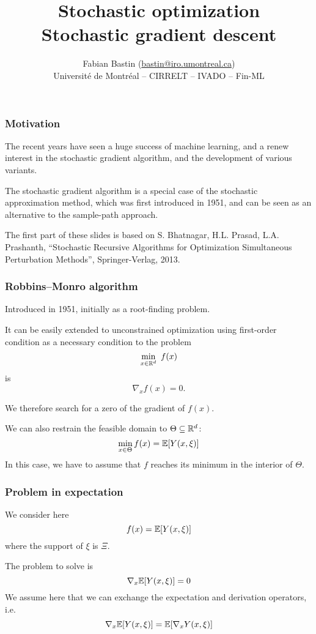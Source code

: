 \documentclass[usepdftitle=false, aspectratio=169]{beamer}
\title[SA vs SAA]{Stochastic optimization\\Stochastic gradient descent}
\author[Fabian Bastin]{Fabian Bastin (\url{bastin@iro.umontreal.ca}) \\ Université de Montréal -- CIRRELT -- IVADO -- Fin-ML}
\date{}
\begin{document}

\frame{\titlepage}

\begin{frame}
\frametitle{Motivation}

The recent years have seen a huge success of machine learning, and a renew interest in the stochastic gradient algorithm, and the development of various variants.

\mbox{}

The stochastic gradient algorithm is a special case of the stochastic approximation method, which was first introduced in 1951, and can be seen as an alternative to the sample-path approach.

\mbox{}

The first part of these slides is based on
S. Bhatnagar, H.L. Prasad, L.A. Prashanth, ``Stochastic Recursive Algorithms for Optimization
Simultaneous Perturbation Methods'', Springer-Verlag, 2013.

\end{frame}

\begin{frame}
\frametitle{Robbins–Monro algorithm}

Introduced in 1951, initially as a root-finding problem.

\mbox{}

It can be easily extended to unconstrained optimization using first-order condition as a necessary condition to the problem
$$
\min_{x \in {\mathbb{R}}^d} \ f(x)
$$
is
$$
\nabla_x f(x) = 0.
$$

\mbox{}

We therefore search for a zero of the gradient of $f(x)$.

\mbox{}

We can also restrain the feasible domain to $\Theta \subseteq {\mathbb{R}}^d$:
$$
\min_{x \in \Theta} f(x) = {\mathbb{E}}[Y(x,\xi)]
$$
In this case, we have to assume that $f$ reaches its minimum in the interior of $\Theta$.

\end{frame}

\begin{frame}
\frametitle{Problem in expectation}

We consider here
$$
f(x) = {\mathbb{E}}[Y(x,\xi)]
$$
where the support of $\xi$ is $\Xi$.

\mbox{}

The problem to solve is
$$
\nabla_x {\mathbb{E}}[Y(x,\xi)] = 0
$$
We assume here that we can exchange the expectation and derivation operators, i.e.
$$
\nabla_x {\mathbb{E}}[Y(x,\xi)] = {\mathbb{E}}[\nabla_x Y(x,\xi)]
$$

\end{frame}
\end{document}
